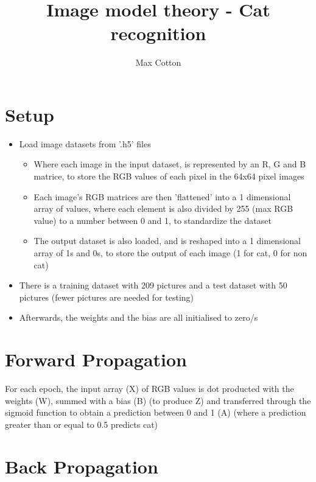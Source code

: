 \documentclass[10pt,a4paper]{article}
\title{Image model theory - Cat recognition}
\author{Max Cotton}
\date{}
\begin{document}
\maketitle

\section{Setup}

\begin{itemize}
    \item Load image datasets from '.h5' files
    \begin{itemize}
        \item Where each image in the input dataset, is represented by an R, G and B matrice, to store the RGB values of each pixel in the 64x64 pixel images
        \item Each image's RGB matrices are then 'flattened' into a 1 dimensional array of values, where each element is also divided by 255 (max RGB value) to a number between 0 and 1, to standardize the dataset
        \item The output dataset is also loaded, and is reshaped into a 1 dimensional array of 1s and 0s, to store the output of each image (1 for cat, 0 for non cat)
    \end{itemize}
    \item There is a training dataset with 209 pictures and a test dataset with 50 pictures (fewer pictures are needed for testing)
    \item Afterwards, the weights and the bias are all initialised to zero/s
\end{itemize}

\section{Forward Propagation}
For each epoch, the input array (X) of RGB values is dot producted with the weights (W), summed with a bias (B) (to produce Z) and transferred through the sigmoid function to obtain a prediction between 0 and 1 (A) (where a prediction greater than or equal to 0.5 predicts cat)

\section{Back Propagation}
\end{document}
